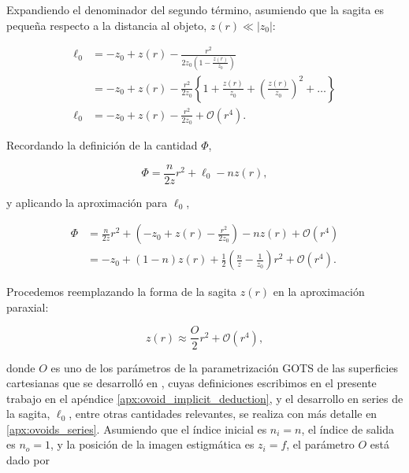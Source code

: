 Expandiendo el denominador del segundo término, asumiendo que la sagita es pequeña respecto a la distancia al objeto, $z(r)\ll |z_0|$:

\begin{align}
    \ell_0
    &=
    -z_0
    +
    z(r)
    -
    \frac{r^2}{2z_0\left(1-\frac{z(r)}{z_0}\right)}
    \nonumber
    \\
    &=
    -z_0
    +
    z(r)
    -
    \frac{r^2}{2z_0}
    \left\{
    1
    +
    \frac{z(r)}{z_0}
    +
    \left(\frac{z(r)}{z_0}\right)^2
    +
    \dots
    \right\}
    \nonumber
    \\
    \ell_0
    &=
    -z_0
    +
    z(r)
    -
    \frac{r^2}{2z_0}
    +
    \mathcal{O}(r^4).
\end{align}

Recordando la definición de la cantidad $\Phi$,

\begin{equation}
    \Phi
    =
    \frac{n}{2z}r^2
    +
    \ell_0
    -
    nz(r),
  \label{eq:phase_definition}
\end{equation}

y aplicando la aproximación para $\ell_0$,

\begin{align}
  \Phi
  &=
  \frac{n}{2z}r^2
  +
  \left(
  -z_0
  +
  z(r)
  -
  \frac{r^2}{2z_0}
  \right)
  -
  nz(r)
  +
  \mathscr O(r^4)
  \nonumber
  \\
  &=
  -z_0
  +
  (1-n)z(r)
  +
  \frac{1}{2}
  \left(
  \frac{n}{z}
  -
  \frac{1}{z_0}
  \right)r^2
  +
  \mathscr O(r^4).
\end{align}

Procedemos reemplazando la forma de la sagita $z(r)$ en la aproximación paraxial:

\begin{equation}
    z(r)
    \approx
    \frac{O}{2}r^2
    +
    \mathcal{O}(r^4),
\end{equation}

donde $O$ es uno de los parámetros de la parametrización GOTS de las superficies cartesianas que se desarrolló en \cite{singlet2020}, cuyas definiciones escribimos en el presente trabajo en el apéndice \ref{apx:ovoid_implicit_deduction}, y el desarrollo en series de la sagita, $\ell_0$, entre otras cantidades relevantes, se realiza con más detalle en \ref{apx:ovoids_series}. Asumiendo que el índice inicial es $n_i=n$, el índice de salida es $n_o=1$, y la posición de la imagen estigmática es $z_i=f$, el parámetro $O$ está dado por

